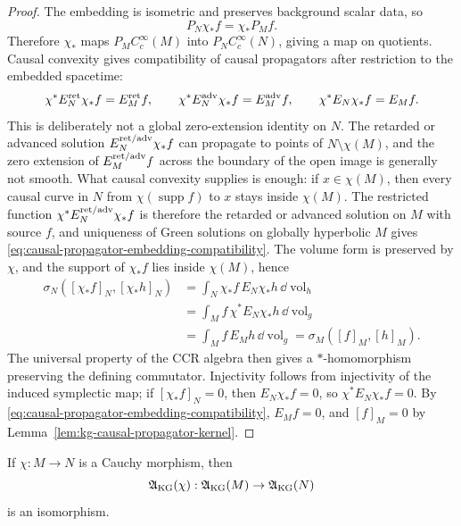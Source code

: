 \begin{proof}
The embedding is isometric and preserves background scalar data, so
\[
  P_N\chi_*f=\chi_*P_Mf .
\]
Therefore \(\chi_*\) maps \(P_MC_c^\infty(M)\) into
\(P_NC_c^\infty(N)\), giving a map on quotients.  Causal convexity gives
compatibility of causal propagators after restriction to the embedded
spacetime:
\begin{equation}
  \chi^*E_N^{\rm ret}\chi_*f=E_M^{\rm ret}f,\qquad
  \chi^*E_N^{\rm adv}\chi_*f=E_M^{\rm adv}f,\qquad
  \chi^*E_N\chi_*f=E_Mf .
  \label{eq:causal-propagator-embedding-compatibility}
\end{equation}
This is deliberately not a global zero-extension identity on \(N\).  The
retarded or advanced solution \(E_N^{\rm ret/adv}\chi_*f\) can propagate to
points of \(N\setminus\chi(M)\), and the zero extension of
\(E_M^{\rm ret/adv}f\) across the boundary of the open image is generally not
smooth.  What causal convexity supplies is enough: if \(x\in\chi(M)\), then
every causal curve in \(N\) from \(\chi(\operatorname{supp}f)\) to \(x\)
stays inside \(\chi(M)\).  The restricted function
\(\chi^*E_N^{\rm ret/adv}\chi_*f\) is therefore the retarded or advanced
solution on \(M\) with source \(f\), and uniqueness of Green solutions on
globally hyperbolic \(M\) gives
\eqref{eq:causal-propagator-embedding-compatibility}.  The volume form is
preserved by \(\chi\), and the support of \(\chi_*f\) lies inside
\(\chi(M)\), hence
\begin{align*}
  \sigma_N([\chi_*f]_N,[\chi_*h]_N)
  &=
  \int_N \chi_*f\,E_N\chi_*h\,\dd\operatorname{vol}_h \\
  &=
  \int_M f\,\chi^*E_N\chi_*h\,\dd\operatorname{vol}_g \\
  &=
  \int_M f\,E_Mh\,\dd\operatorname{vol}_g
  =
  \sigma_M([f]_M,[h]_M).
\end{align*}
The universal property of the CCR algebra then gives a
\(\ast\)-homomorphism preserving the defining commutator.  Injectivity
follows from injectivity of the induced symplectic map; if
\([\chi_*f]_N=0\), then \(E_N\chi_*f=0\), so
\(\chi^*E_N\chi_*f=0\).  By
\eqref{eq:causal-propagator-embedding-compatibility}, \(E_Mf=0\), and
\([f]_M=0\) by
Lemma~\ref{lem:kg-causal-propagator-kernel}.
\end{proof}

\begin{proposition}
\label{prop:kg-time-slice}
If \(\chi:M\to N\) is a Cauchy morphism, then
\[
  \mathfrak A_{\rm KG}(\chi):\mathfrak A_{\rm KG}(M)\to
  \mathfrak A_{\rm KG}(N)
\]
is an isomorphism.
\end{proposition}

